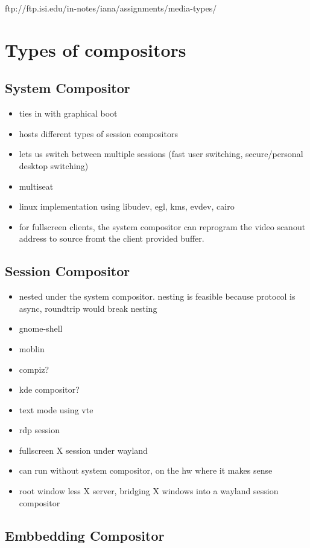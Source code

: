 \documentclass{article}
\begin{document}
ftp://ftp.isi.edu/in-notes/iana/assignments/media-types/


\section{Types of compositors}

\subsection{System Compositor}

\begin{itemize}
\item ties in with graphical boot
\item hosts different types of session compositors
\item lets us switch between multiple sessions (fast user switching,
   secure/personal desktop switching)
\item multiseat
\item linux implementation using libudev, egl, kms, evdev, cairo
\item for fullscreen clients, the system compositor can reprogram the
   video scanout address to source fromt the client provided buffer.
\end{itemize}

\subsection{Session Compositor}

\begin{itemize}
\item nested under the system compositor.  nesting is feasible because
   protocol is async, roundtrip would break nesting
\item gnome-shell
\item moblin
\item compiz?
\item kde compositor?
\item text mode using vte
\item rdp session
\item fullscreen X session under wayland
\item can run without system compositor, on the hw where it makes
   sense
\item root window less X server, bridging X windows into a wayland
   session compositor
\end{itemize}

\subsection{Embbedding Compositor}
\end{document}
